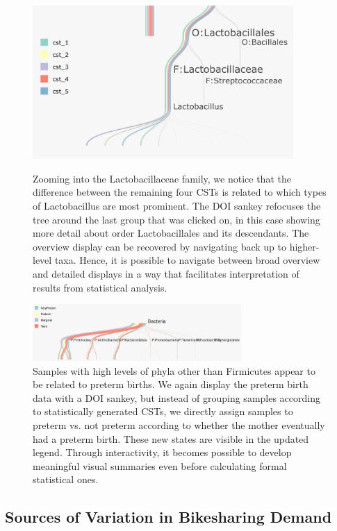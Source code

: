 \documentclass{report}
\begin{document}
\begin{figure}
{\centering \includegraphics[width=375px]{figure/treelapse/preterm_csts_lacto}}
\caption{Zooming into the Lactobacillaceae family, we notice that the difference
  between the remaining four CSTs is related to which types of Lactobacillus are
  most prominent. The DOI sankey refocuses the tree around the last group that
  was clicked on, in this case showing more detail about order Lactobacillales
  and its descendants. The overview display can be recovered by navigating back
  up to higher-level taxa. Hence, it is possible to navigate between broad
  overview and detailed displays in a way that facilitates interpretation of
  results from statistical analysis.}\label{fig:pretermcstslacto}
\end{figure}

\begin{figure}
\centering
\includegraphics[width=300px]{figure/treelapse/preterm_preterm}
\caption{Samples with high levels of phyla other than Firmicutes appear to be
  related to preterm births. We again display the preterm birth data with
  a DOI sankey, but instead of grouping samples according to statistically
  generated CSTs, we directly assign samples to preterm vs. not preterm
  according to whether the mother eventually had a preterm birth. These new
  states are visible in the updated legend. Through interactivity, it becomes
  possible to develop meaningful visual summaries even before calculating formal
  statistical ones.}
\label{fig:pretermpreterm}
\end{figure}

\subsection{Sources of Variation in Bikesharing
Demand}\label{bikesharing-study}
\end{document}
